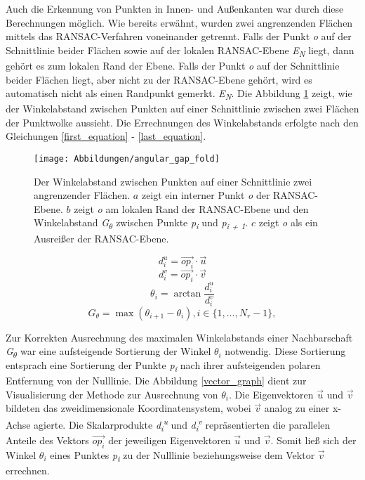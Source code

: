 Auch die Erkennung von Punkten in Innen- und Außenkanten war durch diese Berechnungen möglich. Wie bereits erwähnt, wurden zwei angrenzenden Flächen mittels das RANSAC-Verfahren voneinander getrennt. Falls der Punkt \textit{o} auf der Schnittlinie beider Flächen sowie auf der lokalen RANSAC-Ebene \textit{E\textsubscript{N}} liegt, dann gehört es zum lokalen Rand der Ebene. Falls der Punkt \textit{o} auf der Schnittlinie beider Flächen liegt, aber nicht zu der RANSAC-Ebene gehört, wird es automatisch nicht als einen Randpunkt gemerkt. \textit{E\textsubscript{N}}. Die Abbildung \ref{edge_fold} zeigt, wie der Winkelabstand zwischen Punkten auf einer Schnittlinie zwischen zwei Flächen der Punktwolke aussieht. Die Errechnungen des Winkelabstands erfolgte nach den Gleichungen \ref{first_equation} - \ref{last_equation}.

\begin{figure}[h]
	\texttt{[image: Abbildungen/angular\_gap\_fold]}
	\centering
	\caption{Der Winkelabstand zwischen Punkten auf einer Schnittlinie zwei angrenzender Flächen. \textbf{\(a\)} zeigt ein interner Punkt \textit{o} der RANSAC-Ebene. \textbf{\(b\)} zeigt \textit{o} am lokalen Rand der RANSAC-Ebene und den Winkelabstand \textit{G\textsubscript{$\theta$}} zwischen Punkte \textit{p\textsubscript{i}} und \textit{p\textsubscript{i + 1}}. \textbf{\(c\)} zeigt \textit{o} als ein Ausreißer der RANSAC-Ebene. \autocite{ni_edge_2016}}
	\label{edge_fold}
\end{figure}

\begin{equation}
\label{first_equation}
d_i^u = \vec{{op}_i} \cdot \vec{u}
\end{equation}
\begin{equation}
d_i^v = \vec{{op}_i} \cdot \vec{v}
\end{equation}
\begin{equation}
\theta_i = \arctan{\frac{d_i^u}{d_i^v}}
\end{equation}
\begin{equation}
G_\theta = \max(\theta_{i + 1} - \theta_i), i \in \{1, \ldots, N_r - 1\},
\label{last_equation}
\end{equation}


Zur Korrekten Ausrechnung des maximalen Winkelabstands einer Nachbarschaft \textit{G\textsubscript{$\theta$}} war eine aufsteigende Sortierung der Winkel \textit{$\theta_i$} notwendig. Diese Sortierung entsprach eine Sortierung der Punkte \textit{p\textsubscript{i}} nach ihrer aufsteigenden polaren Entfernung von der Nulllinie. Die Abbildung \ref{vector_graph} dient zur Visualisierung der Methode zur Ausrechnung von $\theta_i$. Die Eigenvektoren $\vec{u}$ und $\vec{v}$ bildeten das zweidimensionale Koordinatensystem, wobei $\vec{v}$ analog zu einer x-Achse agierte. Die Skalarprodukte \textit{d\textsubscript{i}\textsuperscript{u}} und \textit{d\textsubscript{i}\textsuperscript{v}} repräsentierten die parallelen Anteile des Vektors $\vec{{op}_i}$ der jeweiligen Eigenvektoren $\vec{u}$ und $\vec{v}$. Somit ließ sich der Winkel $\theta_i$ eines Punktes \textit{p\textsubscript{i}} zu der Nulllinie beziehungsweise dem Vektor $\vec{v}$ errechnen.


